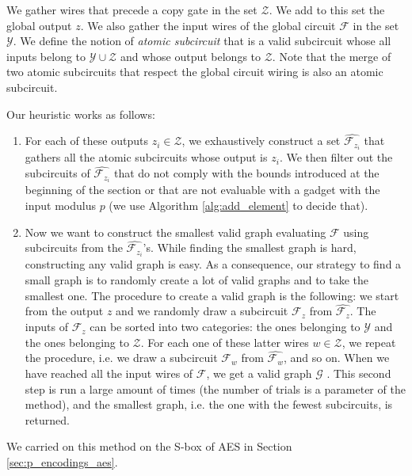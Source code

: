 We gather wires that precede a copy gate in the set $\mathcal{Z}$. We add to this set the global output $z$. We also gather the input wires of the global circuit $\mathcal{F}$ in the set $\mathcal{Y}$. We define the notion of \textit{atomic subcircuit} that is a valid subcircuit whose all inputs belong to $\mathcal{Y} \cup \mathcal{Z}$ and whose output belongs to $\mathcal{Z}$. Note that the merge of two atomic subcircuits that respect the global circuit wiring is also an atomic subcircuit.

\medskip

Our heuristic works as follows:

\begin{enumerate}
    \item For each of these outputs $z_i \in \mathcal{Z}$, we exhaustively construct a set $\widehat{\mathcal{F}_{z_{i}}}$ that gathers all the atomic subcircuits whose output is $z_i$.
    We then filter out the subcircuits of $\widehat{\mathcal{F}_{z_{i}}}$ that do not comply with the bounds introduced at the beginning of the section or that are not evaluable with a gadget with the input modulus $p$ (we use Algorithm \ref{alg:add_element} to decide that).
    \medskip
    \item Now we want to construct the smallest valid graph evaluating $\mathcal{F}$ using subcircuits from the $\widehat{\mathcal{F}_{z_{i}}}$'s. While finding the smallest graph is hard, constructing any valid graph is easy. As a consequence, our strategy to find a small graph is to randomly create a lot of valid graphs and to take the smallest one. The procedure to create a valid graph is the following: we start from the output $z$ and we randomly draw a subcircuit $\mathcal{F}_z$ from $\widehat{\mathcal{F}_z}$. The inputs of $\mathcal{F}_z$ can be sorted into two categories: the ones belonging to $\mathcal{Y}$ and the ones belonging to $\mathcal{Z}$. For each one of these latter wires $w \in \mathcal{Z}$, we repeat the procedure, i.e. we draw a subcircuit $\mathcal{F}_w$ from $\widehat{\mathcal{F}_w}$, and so on. When we have reached all the input wires of $\mathcal{F}$, we get a valid graph $\mathcal{G}$ . This second step is run a large amount of times (the number of trials is a parameter of the method), and the smallest graph, i.e. the one with the fewest subcircuits, is returned.
\end{enumerate}

We carried on this method on the S-box of \gls{AES} in Section \ref{sec:p_encodings_aes}.

